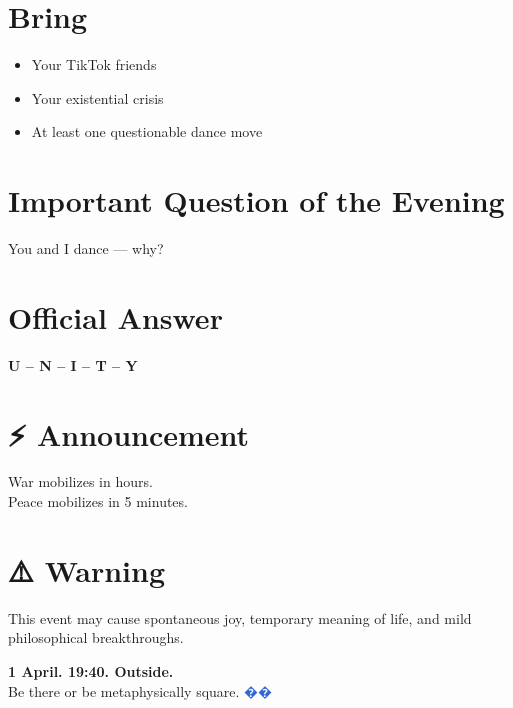 \documentclass{article}
\begin{document}
\section*{Bring}
\begin{itemize}[noitemsep, leftmargin=*]
    \item Your TikTok friends
    \item Your existential crisis
    \item At least one questionable dance move
\end{itemize}

\section*{Important Question of the Evening}
You and I dance — why?

\section*{Official Answer}
\textbf{U – N – I – T – Y}

\section*{⚡ Announcement}
War mobilizes in hours. \\
Peace mobilizes in 5 minutes.

\section*{⚠️ Warning}
This event may cause spontaneous joy, temporary meaning of life, and mild philosophical breakthroughs.

\vspace{1cm}

\begin{center}
    \Huge \textbf{1 April. 19:40. Outside.} \\
    \vspace{0.3cm}
    \LARGE Be there or be metaphysically square. \quad \textcolor{highlight}{��}
\end{center}
\end{document}

